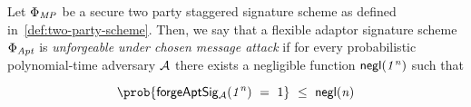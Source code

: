 \begin{definition} Let $\Phi_{\mathit{MP}}$ be a secure two party staggered signature scheme as defined in~\cref{def:two-party-scheme}. Then, we say that a flexible adaptor signature scheme $\Phi_{\mathit{Apt}}$ is \emph{unforgeable under chosen message attack}  if for every probabilistic polynomial-time adversary $\mathcal{A}$ there exists a negligible function $\mathsf{negl}(\mathit{1^n})$ such that 
	
	\[ \prob{\procExpForg{\varSecParam} \opEqNoQ 1} \opSmEq \funNegl{\varN} \]

\begin{center}
    \fbox{
    \begin{varwidth}{\textwidth}
        \procedure[linenumbering]{$\procExpForg{\varSecParam}$} {
        ((\varSecKeyAlice, \varPubKeyAlice), (\varSecKeyBob, \varPubKeyBob)) \opFunResult \procKeyGenPt{\varSecParam}{\varSecParam}\\
        (\varMsg^*) \opFunResult \cnstAdversary^{\procSignOracle{\cdot}{\cdot}}(\varPubKeyAlice, \varPubKeyBob, \varSecKeyBob) \\
        (\varSigAlice \opSeperate \varSigBob) \opFunResult \procSignPt{\varMsg}{\varSecKeyAlice, \varPubKey}{\varSecKeyBob, \varPubKey}\\
        (\varWit, \varStatement) \opFunResult \procGenR{\varSecParam}\\
        \varSigAptBob^* \opFunResult \cnstAdversary^{\procSignOracle{\cdot}{\cdot}}(\varSigBob, \varStatement) \\
        \pcreturn \procVerifyAptSig{\varSigAptBob^*}{\varMsg^*}{\varPubKeyBob}{\varStatement}{}}\\[2\baselineskip]
        \procedure[linenumbering]{$\procSignOracle{\varMsg}{\varSecKeyBob}$} {
        (\varSigAlice \opSeperate \varSigBob) \opFunResult \procSignPt{\varMsg}{\varSecKeyAlice, \varPubKey}{\varSecKeyBob, \varPubKey}\\
        \pcreturn (\varSigAlice \opSeperate \varSigBob)
        }
    \end{varwidth}
    }
\end{center}

	
\end{definition}


